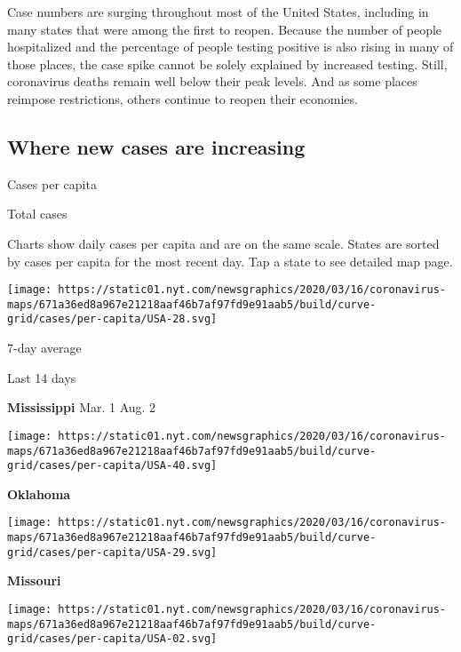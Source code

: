Case numbers are surging throughout most of the United States, including
in many states that were among the first to reopen. Because the number
of people hospitalized and the percentage of people testing positive is
also rising in many of those places, the case spike cannot be solely
explained by increased testing. Still, coronavirus deaths remain well
below their peak levels. And as some places reimpose restrictions,
others continue to reopen their economies.

\hypertarget{where-new-cases-are-increasing}{%
\subsection{Where new cases are
increasing}\label{where-new-cases-are-increasing}}

Cases per capita

Total cases

Charts show daily cases per capita and are on the same scale. States are
sorted by cases per capita for the most recent day. Tap a state to see
detailed map page.

\href{https://www.nytimes.com/interactive/2020/us/mississippi-coronavirus-cases.html}{}

\texttt{[image: https://static01.nyt.com/newsgraphics/2020/03/16/coronavirus-maps/671a36ed8a967e21218aaf46b7af97fd9e91aab5/build/curve-grid/cases/per-capita/USA-28.svg]}

7-day average

Last 14 days

\textbf{Mississippi} Mar. 1 Aug. 2

\href{https://www.nytimes.com/interactive/2020/us/oklahoma-coronavirus-cases.html}{}

\texttt{[image: https://static01.nyt.com/newsgraphics/2020/03/16/coronavirus-maps/671a36ed8a967e21218aaf46b7af97fd9e91aab5/build/curve-grid/cases/per-capita/USA-40.svg]}

\textbf{Oklahoma}

\href{https://www.nytimes.com/interactive/2020/us/missouri-coronavirus-cases.html}{}

\texttt{[image: https://static01.nyt.com/newsgraphics/2020/03/16/coronavirus-maps/671a36ed8a967e21218aaf46b7af97fd9e91aab5/build/curve-grid/cases/per-capita/USA-29.svg]}

\textbf{Missouri}

\href{https://www.nytimes.com/interactive/2020/us/alaska-coronavirus-cases.html}{}

\texttt{[image: https://static01.nyt.com/newsgraphics/2020/03/16/coronavirus-maps/671a36ed8a967e21218aaf46b7af97fd9e91aab5/build/curve-grid/cases/per-capita/USA-02.svg]}

